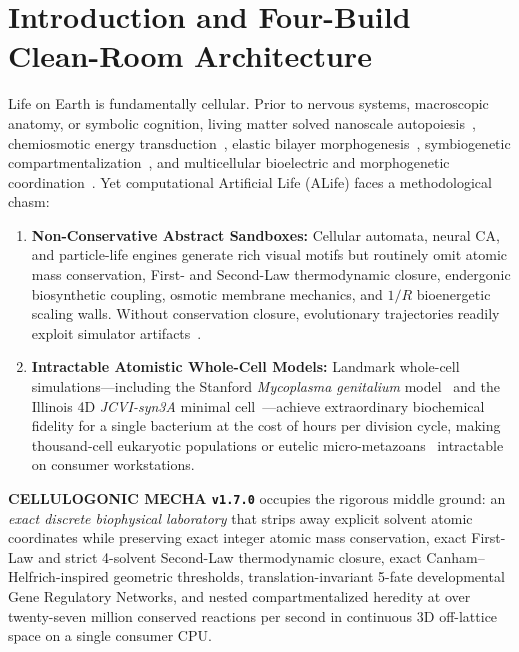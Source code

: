 \documentclass[11pt,reqno]{amsart}
\theoremstyle{plain}
\theoremstyle{definition}
\theoremstyle{remark}
\begin{document}
\maketitle

\section{Introduction and Four-Build Clean-Room Architecture}
\label{sec:intro}

Life on Earth is fundamentally cellular. Prior to nervous systems, macroscopic anatomy, or symbolic cognition, living matter solved nanoscale autopoiesis~\cite{varela1974,ganti1975}, chemiosmotic energy transduction~\cite{mitchell1961}, elastic bilayer morphogenesis~\cite{canham1970,helfrich1973}, symbiogenetic compartmentalization~\cite{margulis1967,lane2010}, and multicellular bioelectric and morphogenetic coordination~\cite{levin2022,wolpert1969,steinberg1963}. Yet computational Artificial Life (ALife) faces a methodological chasm:
\begin{enumerate}[leftmargin=1.8em, itemsep=2pt]
  \item \textbf{Non-Conservative Abstract Sandboxes:} Cellular automata, neural CA, and particle-life engines generate rich visual motifs but routinely omit atomic mass conservation, First- and Second-Law thermodynamic closure, endergonic biosynthetic coupling, osmotic membrane mechanics, and $1/R$ bioenergetic scaling walls. Without conservation closure, evolutionary trajectories readily exploit simulator artifacts~\cite{taylor2016}.
  \item \textbf{Intractable Atomistic Whole-Cell Models:} Landmark whole-cell simulations---including the Stanford \emph{Mycoplasma genitalium} model~\cite{karr2012} and the Illinois 4D \emph{JCVI-syn3A} minimal cell~\cite{hutchison2016,breuer2019,pelletier2021,thornburg2022}---achieve extraordinary biochemical fidelity for a single bacterium at the cost of hours per division cycle, making thousand-cell eukaryotic populations or eutelic micro-metazoans~\cite{szigeti2014} intractable on consumer workstations.
\end{enumerate}

\textbf{CELLULOGONIC MECHA \texttt{v1.7.0}} occupies the rigorous middle ground: an \emph{exact discrete biophysical laboratory} that strips away explicit solvent atomic coordinates while preserving exact integer atomic mass conservation, exact First-Law and strict 4-solvent Second-Law thermodynamic closure, exact Canham--Helfrich-inspired geometric thresholds, translation-invariant 5-fate developmental Gene Regulatory Networks, and nested compartmentalized heredity at over twenty-seven million conserved reactions per second in continuous 3D off-lattice space on a single consumer CPU.
\end{document}
